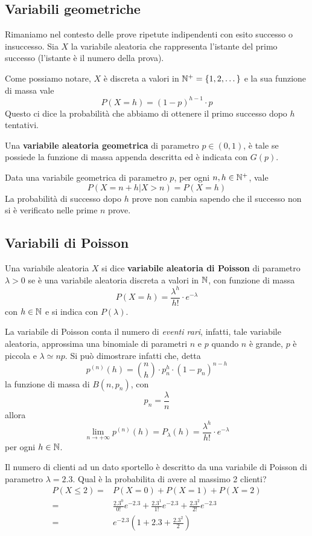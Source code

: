 \subsection{Variabili geometriche}
Rimaniamo nel contesto delle prove ripetute indipendenti con esito successo o insuccesso. Sia $X$
la variabile aleatoria che rappresenta l'istante del primo successo (l'istante è il numero della
prova).

Come possiamo notare, $X$ è discreta a valori in $\mathbb{N}^+ = \{ 1, 2, \dots \}$ e la sua funzione di
massa vale
\[ P(X = h) = (1-p)^{h-1} \cdot p \]
Questo ci dice la probabilità che abbiamo di ottenere il primo successo dopo $h$ tentativi.

Una \textbf{variabile aleatoria geometrica} di parametro $p \in (0,1)$, è tale se possiede la
funzione di massa appenda descritta ed è indicata con $G(p)$.

\begin{proposition}
	Data una variabile geometrica di parametro $p$, per ogni $n,h \in \mathbb{N}^+$, vale
	\[ P(X = n + h | X > n) = P(X = h) \]
	La probabilità di successo dopo $h$ prove non cambia sapendo che il successo non si è
	verificato nelle prime $n$ prove.
\end{proposition}

\subsection{Variabili di Poisson}
Una variabile aleatoria $X$ si dice \textbf{variabile aleatoria di Poisson} di parametro
$\lambda > 0$ se è una variabile aleatoria discreta a valori in $\mathbb{N}$, con funzione di massa
\[ P(X = h) = \frac{\lambda^h}{h!} \cdot e^{-\lambda} \]
con $h \in \mathbb{N}$ e si indica con $P(\lambda)$.

La variabile di Poisson conta il numero di \emph{eventi rari}, infatti, tale variabile aleatoria,
approssima una binomiale di parametri $n$ e $p$ quando $n$ è grande, $p$ è piccola e
$\lambda \simeq np$. Si può dimostrare infatti che, detta
\[ p^{(n)} (h) = \binom{n}{h} \cdot p_n^h \cdot \left( 1-p_n \right)^{n-h} \]
la funzione di massa di $B(n, p_n)$, con
\[ p_n = \frac{\lambda}{n} \]
allora
\[ \lim_{n \to +\infty} p^{(n)} (h) = P_\lambda (h) = \frac{\lambda^h}{h!} \cdot e^{-\lambda} \]
per ogni $h \in \mathbb{N}$.

\begin{example}
	Il numero di clienti ad un dato sportello è descritto da una variabile di Poisson di parametro
	$\lambda = 2.3$. Qual è la probabilita di avere al massimo 2 clienti?
	\begin{align*}
		P(X \leq 2) = & P(X = 0) + P(X = 1) + P(X = 2)                          \\
		=             & \frac{2.3^0}{0!} e^{-2.3} + \frac{2.3^1}{1!} e^{-2.3} +
		\frac{2.3^2}{2!} e^{-2.3}                                               \\
		=             & e^{-2.3} \left( 1 + 2.3 + \frac{2.3^2}{2} \right)
	\end{align*}
\end{example}

